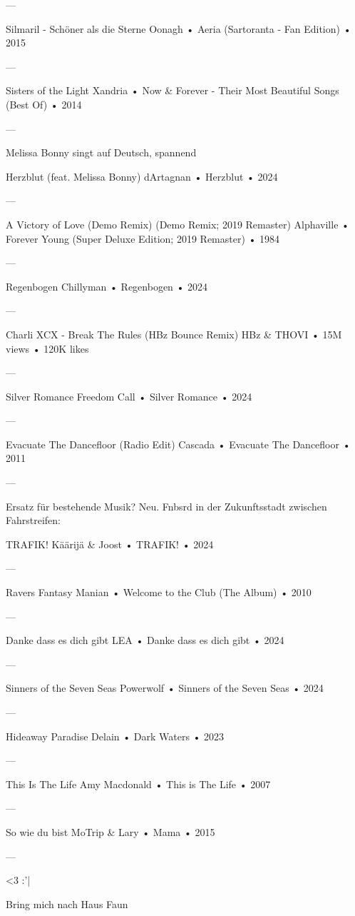 —

Silmaril - Schöner als die Sterne
Oonagh
 •
Aeria (Sartoranta - Fan Edition)
 •
2015

—

Sisters of the Light
Xandria
 •
Now & Forever - Their Most Beautiful Songs (Best Of)
 •
2014

—

Melissa Bonny singt auf Deutsch, spannend

Herzblut (feat. Melissa Bonny)
dArtagnan
 •
Herzblut
 •
2024


—

A Victory of Love (Demo Remix) (Demo Remix; 2019 Remaster)
Alphaville
 •
Forever Young (Super Deluxe Edition; 2019 Remaster)
 •
1984

—

Regenbogen
Chillyman
 •
Regenbogen
 •
2024

—

Charli XCX - Break The Rules (HBz Bounce Remix)
HBz
 &
THOVI
 •
15M views
 •
120K likes

—

Silver Romance
Freedom Call
 •
Silver Romance
 •
2024

—

Evacuate The Dancefloor (Radio Edit)
Cascada
 •
Evacuate The Dancefloor
 •
2011

—

Ersatz für bestehende Musik? Neu.
Fnbsrd in der Zukunftsstadt zwischen Fahrstreifen:

TRAFIK!
Käärijä
 &
Joost
 •
TRAFIK!
 •
2024

—

Ravers Fantasy
Manian
 •
Welcome to the Club (The Album)
 •
2010

—

Danke dass es dich gibt
LEA
 •
Danke dass es dich gibt
 •
2024

—

Sinners of the Seven Seas
Powerwolf
 •
Sinners of the Seven Seas
 •
2024

—

Hideaway Paradise
Delain
 •
Dark Waters
 •
2023


—

This Is The Life
Amy Macdonald
 •
This is The Life
 •
2007

—

So wie du bist
MoTrip
 &
Lary
 •
Mama
 •
2015


—

<3
:'|

Bring mich nach Haus
Faun

